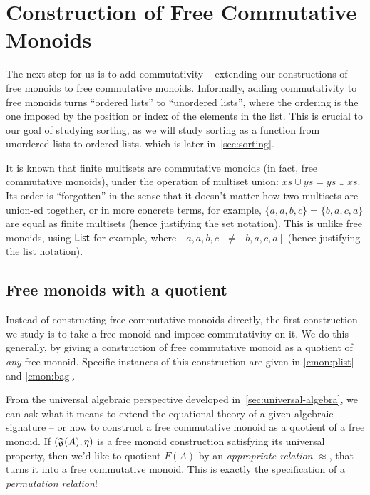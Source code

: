 \section{Construction of Free Commutative Monoids}
\label{sec:commutative-monoids}

The next step for us is to add commutativity -- extending our constructions of free monoids to free commutative monoids.
%
Informally, adding commutativity to free monoids turns ``ordered lists'' to ``unordered lists'',
where the ordering is the one imposed by the position or index of the elements in the list.
%
This is crucial to our goal of studying sorting,
as we will study sorting as a function from unordered lists to ordered lists.
which is later in~\cref{sec:sorting}.

It is known that finite multisets are commutative monoids (in fact, free commutative monoids),
under the operation of multiset union: $xs \cup ys = ys \cup xs$.
%
Its order is ``forgotten'' in the sense that it doesn't matter how two multisets are union-ed together,
or in more concrete terms, for example, $\{a, a, b, c\} = \{b, a, c, a\}$ are equal as finite multisets
(hence justifying the set notation).
%
This is unlike free monoids, using $\operatorname{\mathsf{List}}$ for example,
where $[a, a, b, c] \neq [b, a, c, a]$ (hence justifying the list notation).

\subsection{Free monoids with a quotient}\label{cmon:qfreemon}

Instead of constructing free commutative monoids directly, the first construction we study is to take a free monoid and
impose commutativity on it.
%
We do this generally, by giving a construction of free commutative monoid as a quotient of \emph{any} free monoid.
%
Specific instances of this construction are given in \cref{cmon:plist} and \cref{cmon:bag}.

From the universal algebraic perspective developed in~\cref{sec:universal-algebra},
we can ask what it means to extend the equational theory of a given algebraic signature --
or how to construct a free commutative monoid as a quotient of a free monoid.
%
If $(\mathfrak{F}(A), \eta)$ is a free monoid construction satisfying its universal property,
then we'd like to quotient $F(A)$ by an \emph{appropriate relation} $\approx$,
that turns it into a free commutative monoid.
%
This is exactly the specification of a \emph{permutation relation}!

